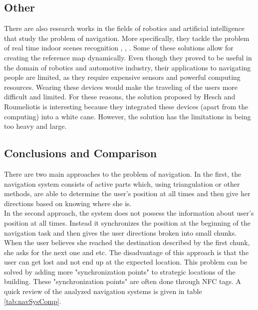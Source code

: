 \subsection{Other}
There are also research works in the fields of robotics and artificial intelligence that study the problem of navigation. More specifically, they tackle the problem of real time indoor scenes recognition \cite{espinace}, \cite{quattoni}, \cite{bosch}. Some of these solutions allow for creating the reference map dynamically. Even though they proved to be useful in the domain of robotics and automotive industry, their applications to navigating people are limited, as they require expensive sensors and powerful computing resources. Wearing these devices would make the traveling of the users more difficult and limited. For these reasons, the solution proposed by Hesch and Roumeliotis \cite{hesch} is interesting because they integrated these devices (apart from the computing) into a white cane. However, the solution has the limitations in being too heavy and large.

\subsection{Conclusions and Comparison}
There are two main approaches to the problem of navigation. In the first, the navigation system consists of active parts which, using triangulation or other methods, are able to determine the user's position at all times and then give her directions based on knowing where she is.\\In the second approach, the system does not possess the information about user's position at all times. Instead it synchronizes the position at the beginning of the navigation task and then gives the user directions broken into small chunks. When the user believes she reached the destination described by the first chunk, she asks for the next one and etc. The disadvantage of this approach is that the user can get lost and not end up at the expected location. This problem can be solved by adding more "synchronization points" to strategic locations of the building. These "synchronization points" are often done through NFC tags. A quick review of the analyzed navigation systems is given in table \ref{tab:navSysComp}.



